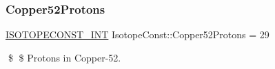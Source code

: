 \subsubsection{\texorpdfstring{Copper52\+Protons}{Copper52Protons}}
{\footnotesize\ttfamily \mbox{\hyperlink{group___isotope_const-_macros_ga5f18360b3e99483a35c32d789e62621c}{I\+S\+O\+T\+O\+P\+E\+C\+O\+N\+S\+T\+\_\+\+I\+NT}} Isotope\+Const\+::\+Copper52\+Protons = 29}

\$ \$ Protons in Copper-\/52. 